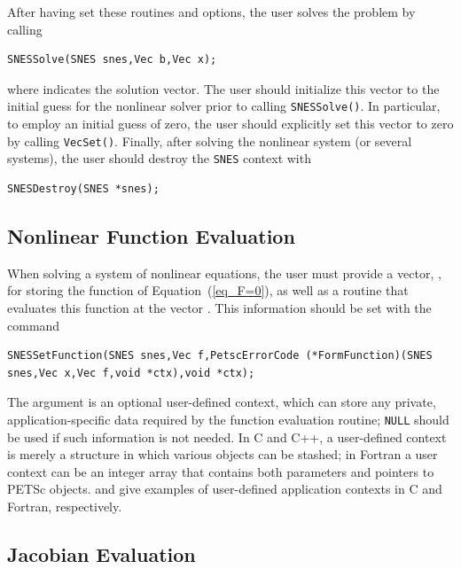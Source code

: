 After having set these routines and options, the user
solves the problem by calling
\begin{lstlisting}
SNESSolve(SNES snes,Vec b,Vec x);
\end{lstlisting}
where  indicates the solution vector. The user should
initialize this vector to the initial guess for the nonlinear solver
prior to calling \lstinline{SNESSolve()}.  In particular, to employ an
initial guess of zero, the user should explicitly set this vector to
zero by calling \lstinline{VecSet()}.  Finally, after solving the nonlinear
system (or several systems), the user should destroy the \lstinline{SNES} context
with
\begin{lstlisting}
SNESDestroy(SNES *snes);
\end{lstlisting}

\subsection{Nonlinear Function Evaluation}
\label{sec_snesfunction}

When solving a system of nonlinear equations, the user must provide
a vector, , for storing the function of
Equation~(\ref{eq_F=0}), as well as a routine that evaluates this
function at the vector .  This information should be set with
the command
\begin{lstlisting}
SNESSetFunction(SNES snes,Vec f,PetscErrorCode (*FormFunction)(SNES snes,Vec x,Vec f,void *ctx),void *ctx);
\end{lstlisting}
The argument  is an optional user-defined context, which can
store any private, application-specific data required by the
function evaluation routine; \lstinline{NULL} should be used if such information
is not needed.  In C and C++, a user-defined context is merely a
structure in which various objects can be stashed; in Fortran a user
context can be an integer array that contains both parameters and
pointers to PETSc objects. \href{https://www.mcs.anl.gov/petsc/petsc-current/src/snes/examples/tutorials/ex5.c.html}{} and
\href{https://www.mcs.anl.gov/petsc/petsc-current/src/snes/examples/tutorials/ex5f.F90.html}{} give examples of user-defined
application contexts in C and Fortran, respectively.

\subsection{Jacobian Evaluation}
\label{sec_snesjacobian}


